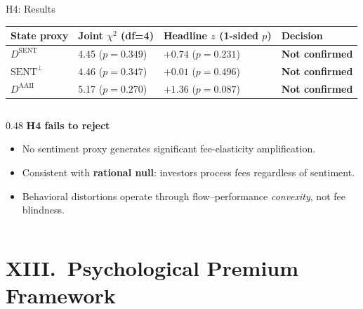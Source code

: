 \documentclass[10pt, aspectratio=169]{beamer}
\newcommand{\no}{\textcolor{alertred}{\textbf{Not confirmed}}}
\begin{document}
\begin{frame}{H4: Results}
  \scriptsize
  \begin{tabular}{lp{3.6cm}p{3.0cm}p{1.6cm}}
    \toprule
    State proxy & Joint $\chi^2$ (df=4) & Headline $z$ (1-sided $p$) & Decision \\
    \midrule
    $D^{\text{SENT}}$   & 4.45 ($p=0.349$) & $+0.74$ ($p=0.231$) & \no \\
    $\text{SENT}^\perp$ & 4.46 ($p=0.347$) & $+0.01$ ($p=0.496$) & \no \\
    $D^{\text{AAII}}$   & 5.17 ($p=0.270$) & $+1.36$ ($p=0.087$) & \no \\
    \bottomrule
  \end{tabular}
  \normalsize
  \vspace{12pt}
  \begin{columns}[T]
    \begin{column}{0.48\textwidth}
      \small\textbf{H4 fails to reject}
      \begin{itemize}\itemsep2pt
        \item No sentiment proxy generates significant fee-elasticity amplification.
        \item Consistent with \textbf{rational null}: investors process fees
              regardless of sentiment.
        \item Behavioral distortions operate through flow–performance \emph{convexity}, not fee blindness.
      \end{itemize}
    \end{column}
  \end{columns}
\end{frame}

\section{XIII.\ Psychological Premium Framework}
\end{document}
